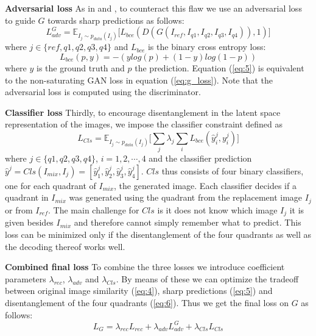 \documentclass[12pt,a4paper]{article}
\begin{document}
\textbf{Adversarial loss} As in \cite{1711.07410} and \cite{1511.05440}, to counteract this flaw we use an adversarial loss to guide $G$ towards sharp predictions as follows:
\begin{equation} \label{eq:5}
    L^G_{adv} = \mathbb{E}_{I_{j}\sim p_{data} (I_{j})}\big[ L_{bce}(D(G(I_{ref},I_{q1},I_{q2},I_{q3},I_{q4})), 1)\big]
\end{equation}
where $j \in \{ref,q1,q2,q3,q4\}$ and $L_{bce}$ is the binary cross entropy loss:
\begin{equation} \label{eq:6}
    L_{bce}(p, y) = -(ylog(p) + (1 - y)log(1-p))
\end{equation}
where $y$ is the ground truth and $p$ the prediction. Equation (\ref{eq:5}) is equivalent to the non-saturating GAN loss in equation (\ref{eq:g_loss}). Note that the adversarial loss is computed using the discriminator.

\textbf{Classifier loss} Thirdly, to encourage disentanglement in the latent space representation of the images, we impose the classifier constraint defined as
\begin{equation} \label{eq:7}
    L_{Cls} = \mathbb{E}_{I_{j}\sim p_{data} (I_{j})}\big[\sum_{j} \lambda_j \sum_{i} L_{bce}(\hat{y}^j_i, y^j_i)\big]
\end{equation}
where $j \in \{q1,q2,q3,q4\}$, $i=1,2,\cdots,4$ and the classifier prediction $\hat{y}^j = Cls(I_{mix}, I_j) = [\hat{y}^j_1, \hat{y}^j_2, \hat{y}^j_3, \hat{y}^j_4]$. $Cls$ thus consists of four binary classifiers, one for each quadrant of $I_{mix}$, the generated image. Each classifier decides if a quadrant in $I_{mix}$ was generated using the quadrant from the replacement image $I_j$ or from $I_{ref}$. The main challenge for $Cls$ is it does not know which image $I_j$ it is given besides $I_{mix}$ and therefore cannot simply remember what to predict. This loss can be minimized only if the disentanglement of the four quadrants as well as the decoding thereof works well.

\textbf{Combined final loss} To combine the three losses we introduce coefficient parameters $\lambda_{rec}$, $\lambda_{adv}$ and $\lambda_{Cls}$. By means of these we can optimize the tradeoff between original image similarity (\ref{eq:4}), sharp predictions (\ref{eq:5}) and disentanglement of the four quadrants (\ref{eq:6}). Thus we get the final loss on $G$ as follows:
\begin{equation} \label{eq:g_loss_comp}
    L_{G} = \lambda_{rec} L_{rec} + \lambda_{adv} L^G_{adv} + \lambda_{Cls} L_{Cls}
\end{equation}
\end{document}
